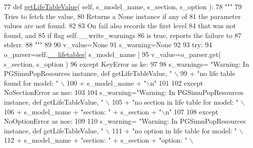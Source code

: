 \begin{DoxyCode}
77     \textcolor{keyword}{def }\hyperlink{classnegui_1_1pgsimupopresources_1_1PGSimuPopResources_a37fa2c7b4da84a2281231943a8e61c6c}{getLifeTableValue}( self, s\_model\_name, s\_section, s\_option ):
78         \textcolor{stringliteral}{"""}
79 \textcolor{stringliteral}{        Tries to fetch the value, }
80 \textcolor{stringliteral}{        Returns a None instance if any of }
81 \textcolor{stringliteral}{        the parameter values are not found.}
82 \textcolor{stringliteral}{}
83 \textcolor{stringliteral}{        On fail also records the first level}
84 \textcolor{stringliteral}{        that was not found, and}
85 \textcolor{stringliteral}{        if flag self.\_\_write\_warnings}
86 \textcolor{stringliteral}{        is true, reports the failure to}
87 \textcolor{stringliteral}{        stderr.}
88 \textcolor{stringliteral}{        """}
89 
90         v\_value=\textcolor{keywordtype}{None}
91         s\_warning=\textcolor{keywordtype}{None}
92 
93         \textcolor{keywordflow}{try}:
94             o\_parser=self.\hyperlink{classnegui_1_1pgsimupopresources_1_1PGSimuPopResources_ae32ca7cc4b6a1563734a82da0a0c6608}{\_\_lifetables}[ s\_model\_name ]
95             v\_value=o\_parser.get( s\_section, s\_option )
96         \textcolor{keywordflow}{except} KeyError \textcolor{keyword}{as} ke:
97 
98             s\_warnings= \textcolor{stringliteral}{"Warning: In PGSimuPopResources instance, def getLifeTableValue, "} \(\backslash\)
99                     + \textcolor{stringliteral}{"no life table found for model: "}  \(\backslash\)
100                     + s\_model\_name + \textcolor{stringliteral}{"\(\backslash\)n"} 
101 
102         \textcolor{keywordflow}{except} NoSectionError \textcolor{keyword}{as} nse:
103 
104             s\_warning=\textcolor{stringliteral}{"Warning: In PGSimuPopResources instance, def getLifeTableValue, "} \(\backslash\)
105                     + \textcolor{stringliteral}{"no section in life table for model: "}  \(\backslash\)
106                     + s\_model\_name + \textcolor{stringliteral}{"section: "} + s\_section + \textcolor{stringliteral}{"\(\backslash\)n"} 
107 
108         \textcolor{keywordflow}{except} NoOptionError \textcolor{keyword}{as} noe:
109 
110             s\_warning= \textcolor{stringliteral}{"Warning: In PGSimuPopResources instance, def getLifeTableValue, "} \(\backslash\)
111                     + \textcolor{stringliteral}{"no option in life table for model: "}  \(\backslash\)
112                     + s\_model\_name + \textcolor{stringliteral}{"section: "} + s\_section + \textcolor{stringliteral}{"option: "} \(\backslash\)

\end{DoxyCode}
